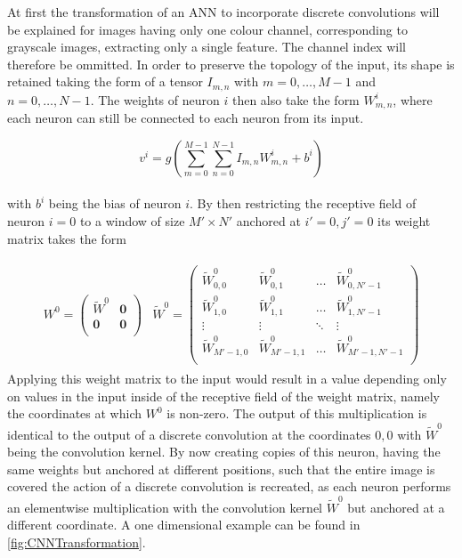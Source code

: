 At first the transformation of an ANN to incorporate discrete convolutions will be explained for images having only one colour channel, corresponding to grayscale images, extracting only a single feature. The channel index will therefore be ommitted. In order to preserve the topology of the input, its shape is retained taking the form of a tensor $I_{m,n}$ with $m=0,\dots ,M-1$ and $n=0,\dots ,N-1$. The weights of neuron $i$ then also take the form $W^i_{m,n}$, where each neuron can still be connected to each neuron from its input.

\begin{equation}
v^i = g\left( \sum_{m=0}^{M-1} \sum_{n=0}^{N-1} I_{m,n} W_{m,n}^i + b^i \right)
\end{equation} \\
with $b^i$ being the bias of neuron $i$. By then restricting the receptive field of neuron $i=0$ to a window of size $M'\times N'$ anchored at $i'=0,j'=0$ its weight matrix takes the form

\begin{align}
\begin{split}
W^0 = 
\begin{pmatrix}
\tilde{W}^0 & \boldsymbol{0} \\
\boldsymbol{0} & \boldsymbol{0} \\
\end{pmatrix}
\end{split}
\begin{split}
\tilde{W}^0 = 
\begin{pmatrix}
\tilde{W}_{0,0}^0 & \tilde{W}_{0,1}^0 & \dots & \tilde{W}_{0,N'-1}^0 \\
\tilde{W}_{1,0}^0 & \tilde{W}_{1,1}^0 & \dots & \tilde{W}_{1,N'-1}^0 \\
\vdots & \vdots & \ddots & \vdots \\
\tilde{W}_{M'-1,0}^0 & \tilde{W}_{M'-1,1}^0 & \dots & \tilde{W}_{M'-1,N'-1}^0 \\
\end{pmatrix}
\end{split}
\end{align}
Applying this weight matrix to the input would result in a value depending only on values in the input inside of the receptive field of the weight matrix, namely the coordinates at which $W^0$ is non-zero. The output of this multiplication is identical to the output of a discrete convolution at the coordinates $0,0$ with $\tilde{W}^0$ being the convolution kernel. By now creating copies of this neuron, having the same weights but anchored at different positions, such that the entire image is covered the action of a discrete convolution is recreated, as each neuron performs an elementwise multiplication with the convolution kernel $\tilde{W}^0$ but anchored at a different coordinate. A one dimensional example can be found in \ref{fig:CNNTransformation}.\\

